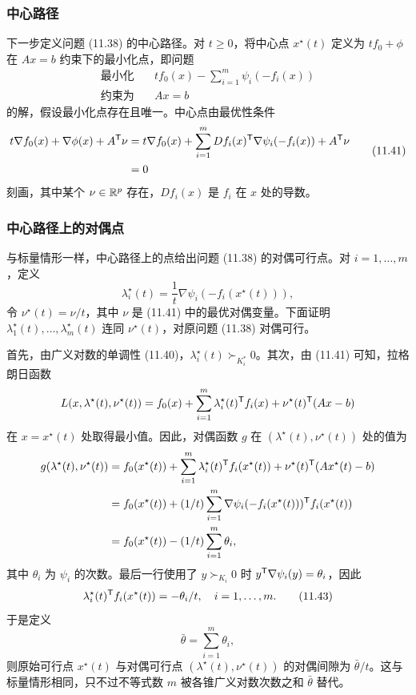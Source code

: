 \subsubsection*{中心路径}
下一步定义问题 (11.38) 的中心路径。对 $t\ge0$，将中心点 $x^\star(t)$ 定义为 $tf_0+\phi$ 在 $Ax=b$ 约束下的最小化点，即问题
\[
\begin{aligned}
\text{最小化}\quad&tf_0(x)-\sum_{i=1}^m\psi_i(-f_i(x))\\
\text{约束为}\quad&Ax=b
\end{aligned}
\]
的解，假设最小化点存在且唯一。中心点由最优性条件
\begin{equation}\begin{aligned}
t\nabla f_0(x)+\nabla\phi(x)+A^\mathsf T\nu
&=t\nabla f_0(x)+\sum_{i=1}^m Df_i(x)^\mathsf T\nabla\psi_i(-f_i(x))+A^\mathsf T\nu\\
&=0
\end{aligned}\tag{11.41}\end{equation}
刻画，其中某个 $\nu\in\mathbb R^p$ 存在，$Df_i(x)$ 是 $f_i$ 在 $x$ 处的导数。

\subsubsection*{中心路径上的对偶点}
与标量情形一样，中心路径上的点给出问题 (11.38) 的对偶可行点。对 $i=1,\ldots,m$，定义
\begin{equation}
\lambda_i^\star(t)=\frac1t\nabla\psi_i(-f_i(x^\star(t))),\tag{11.42}
\end{equation}
令 $\nu^\star(t)=\nu/t$，其中 $\nu$ 是 (11.41) 中的最优对偶变量。下面证明 $\lambda_1^\star(t),\ldots,\lambda_m^\star(t)$ 连同 $\nu^\star(t)$，对原问题 (11.38) 对偶可行。

首先，由广义对数的单调性 (11.40)，$\lambda_i^\star(t)\succ_{K_i^*}0$。其次，由 (11.41) 可知，拉格朗日函数
\[
L(x,\lambda^\star(t),\nu^\star(t))=f_0(x)+\sum_{i=1}^m\lambda_i^\star(t)^\mathsf T f_i(x)
+\nu^\star(t)^\mathsf T(Ax-b)
\]
在 $x=x^\star(t)$ 处取得最小值。因此，对偶函数 $g$ 在 $(\lambda^\star(t),\nu^\star(t))$ 处的值为
\begin{align*}
g(\lambda^\star(t),\nu^\star(t))
&=f_0(x^\star(t))+\sum_{i=1}^m\lambda_i^\star(t)^\mathsf T f_i(x^\star(t))
+\nu^\star(t)^\mathsf T(Ax^\star(t)-b)\\
&=f_0(x^\star(t))+(1/t)\sum_{i=1}^m\nabla\psi_i(-f_i(x^\star(t)))^\mathsf T f_i(x^\star(t))\\
&=f_0(x^\star(t))-(1/t)\sum_{i=1}^m\theta_i,
\end{align*}
其中 $\theta_i$ 为 $\psi_i$ 的次数。最后一行使用了 $y\succ_{K_i}0$ 时 $y^\mathsf T\nabla\psi_i(y)=\theta_i$，因此
\begin{equation}
\lambda_i^\star(t)^\mathsf T f_i(x^\star(t))=-\theta_i/t,\quad i=1,\ldots,m.\tag{11.43}
\end{equation}
于是定义
\[
\bar\theta=\sum_{i=1}^m\theta_i,
\]
则原始可行点 $x^\star(t)$ 与对偶可行点 $(\lambda^\star(t),\nu^\star(t))$ 的对偶间隙为 $\bar\theta/t$。这与标量情形相同，只不过不等式数 $m$ 被各锥广义对数次数之和 $\bar\theta$ 替代。

